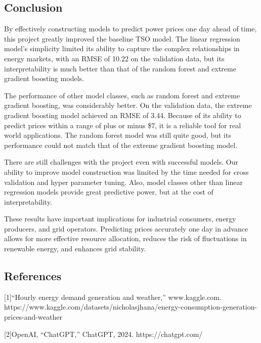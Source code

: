 \documentclass[
]{article}
\begin{document}
\subsection{Conclusion}\label{conclusion}

By effectively constructing models to predict power prices one day ahead
of time, this project greatly improved the baseline TSO model. The
linear regression model's simplicity limited its ability to capture the
complex relationships in energy markets, with an RMSE of 10.22 on the
validation data, but its interpretability is much better than that of
the random forest and extreme gradient boosting models.

The performance of other model classes, such as random forest and
extreme gradient boosting, was considerably better. On the validation
data, the extreme gradient boosting model achieved an RMSE of 3.44.
Because of its ability to predict prices within a range of plus or minus
\$7, it is a reliable tool for real world applications. The random
forest model was still quite good, but its performance could not match
that of the extreme gradient boosting model.

There are still challenges with the project even with successful models.
Our ability to improve model construction was limited by the time needed
for cross validation and hyper parameter tuning. Also, model classes
other than linear regression models provide great predictive power, but
at the cost of interpretability.

These results have important implications for industrial consumers,
energy producers, and grid operators. Predicting prices accurately one
day in advance allows for more effective resource allocation, reduces
the risk of fluctuations in renewable energy, and enhances grid
stability.

\subsection{References}\label{references}

{[}1{]}``Hourly energy demand generation and weather,'' www.kaggle.com.
https://www.kaggle.com/datasets/nicholasjhana/energy-consumption-generation-prices-and-weather

{[}2{]}OpenAI, ``ChatGPT,'' ChatGPT, 2024. https://chatgpt.com/
\end{document}
